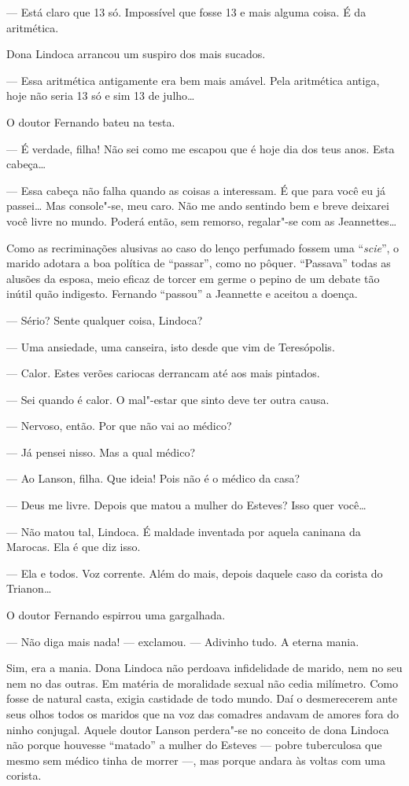 --- Está claro que 13 só. Impossível que fosse 13 e mais alguma coisa. É
da aritmética.

Dona Lindoca arrancou um suspiro dos mais sucados.

--- Essa aritmética antigamente era bem mais amável. Pela aritmética
antiga, hoje não seria 13 só e sim 13 de julho\ldots{}

O doutor Fernando bateu na testa.

--- É verdade, filha! Não sei como me escapou que é hoje dia dos teus
anos. Esta cabeça\ldots{}

--- Essa cabeça não falha quando as coisas a interessam. É que para você
eu já passei\ldots{} Mas console"-se, meu caro. Não me ando sentindo bem
e breve deixarei você livre no mundo. Poderá então, sem remorso,
regalar"-se com as Jeannettes\ldots{}

Como as recriminações alusivas ao caso do lenço perfumado fossem uma
``\emph{scie}'', o marido adotara a boa política de ``passar'', como no
pôquer. ``Passava'' todas as alusões da esposa, meio eficaz de torcer em
germe o pepino de um debate tão inútil quão indigesto. Fernando
``passou'' a Jeannette e aceitou a doença.

--- Sério? Sente qualquer coisa, Lindoca?

--- Uma ansiedade, uma canseira, isto desde que vim de Teresópolis.

--- Calor. Estes verões cariocas derrancam até aos mais pintados.

--- Sei quando é calor. O mal"-estar que sinto deve ter outra causa.

--- Nervoso, então. Por que não vai ao médico?

--- Já pensei nisso. Mas a qual médico?

--- Ao Lanson, filha. Que ideia! Pois não é o médico da casa?

--- Deus me livre. Depois que matou a mulher do Esteves? Isso quer
você\ldots{}

--- Não matou tal, Lindoca. É maldade inventada por aquela caninana da
Marocas. Ela é que diz isso.

--- Ela e todos. Voz corrente. Além do mais, depois daquele caso da
corista do Trianon\ldots{}

O doutor Fernando espirrou uma gargalhada.

--- Não diga mais nada! --- exclamou. --- Adivinho tudo. A eterna mania.

Sim, era a mania. Dona Lindoca não perdoava infidelidade de marido, nem
no seu nem no das outras. Em matéria de moralidade sexual não cedia
milímetro. Como fosse de natural casta, exigia castidade de todo mundo.
Daí o desmerecerem ante seus olhos todos os maridos que na voz das
comadres andavam de amores fora do ninho conjugal. Aquele doutor Lanson
perdera"-se no conceito de dona Lindoca não porque houvesse ``matado'' a
mulher do Esteves --- pobre tuberculosa que mesmo sem médico tinha de
morrer ---, mas porque andara às voltas com uma corista.

